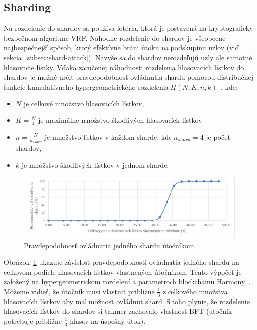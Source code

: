 \subsection{Sharding}
Na rozdelenie do shardov sa používa lotéria, ktorá je postavená na kryptograficky bezpečnom algoritme VRF. Náhodne rozdelenie do shardov je všeobecne najbezpečnejší spôsob, ktorý efektívne bráni útoku na podskupinu uzlov (viď sekcia~\ref{subsec:shard-attack}). Navyše sa do shardov nerozdeľujú uzly ale samotné hlasovacie lístky. Vďaka zaručenej náhodnosti rozdelenia hlasovacích lístkov do shardov je možné určiť pravdepodobnosť ovládnutia shardu pomocou distribučnej funkcie kumulatívneho hypergeometrického rozdelenia $H(N,K,n,k)$~\cite{rice2006mathematical, harmonyWp}, kde:
\begin{itemize}
	\item $N$ je celkové množstvo hlasovacích lístkov,
	\item $K = \frac{N}{4}$ je maximálne množstvo škodlivých hlasovacích lístkov
	\item $n = \frac{N}{n_{shard}}$ je množstvo lístkov v každom sharde, kde $n_{shard} = 4$ je počet shardov,
	\item $k$ je množstvo škodlivých lístkov v jednom sharde.
\end{itemize}

\begin{figure}[bt]
	\centering
	\includegraphics[width=\textwidth]{obrazky-figures/hypergeom-dist}
	\caption{Pravdepodobnosť ovládnutia jedného shardu útočníkom.}
	\label{img:hypergeom-dist}
\end{figure}

Obrázok~\ref{img:hypergeom-dist} ukazuje závislosť pravdepodobnosti ovládnutia jedného shardu na celkovom podiele hlasovacích lístkov vlastnených útočníkom. Tento výpočet je založený na hypergeometrickom rozdelení a parametroch blockchainu Harmony~\cite{harmonyWp}. Môžeme vidieť, že útočník musí vlastniť približne $\frac{1}{3}$ z celkového množstva hlasovacích lístkov aby mal možnosť ovládnuť shard. S toho plynie, že rozdelenie hlasovacích lístkov do shardov si takmer zachovalo vlastnosť BFT (útočník potrebuje približne $\frac{1}{3}$ hlasov na úspešný útok).

